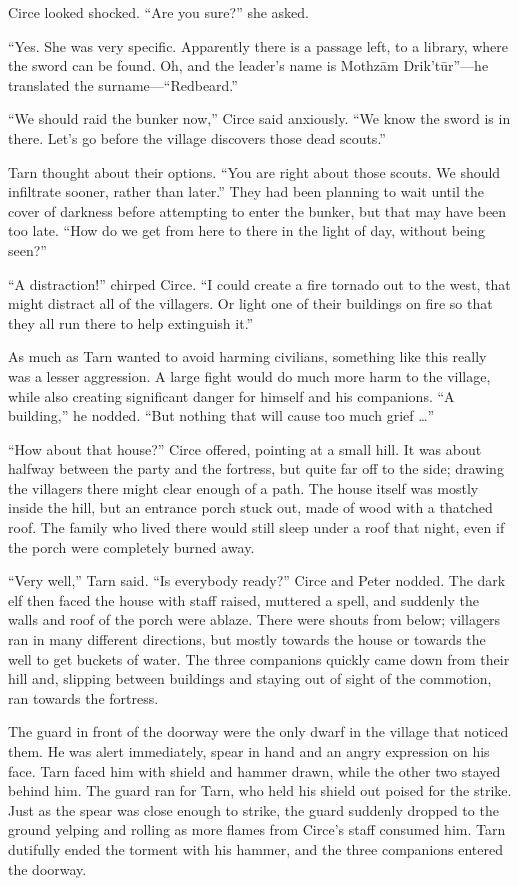 Circe looked shocked.  ``Are you sure?'' she asked.

``Yes.  She was very specific.  Apparently there is a passage left, to a library, where the sword can be found.  Oh, and the leader's name is Mothz\=am Drik't\=ur''---he translated the surname---``Redbeard.''

``We should raid the bunker now,'' Circe said anxiously.  ``We know the sword is in there.  Let's go before the village discovers those dead scouts.''

Tarn thought about their options.  ``You are right about those scouts.  We should infiltrate sooner, rather than later.''  They had been planning to wait until the cover of darkness before attempting to enter the bunker, but that may have been too late.  ``How do we get from here to there in the light of day, without being seen?''

``A distraction!'' chirped Circe.  ``I could create a fire tornado out to the west, that might distract all of the villagers.  Or light one of their buildings on fire so that they all run there to help extinguish it.''

As much as Tarn wanted to avoid harming civilians, something like this really was a lesser aggression.  A large fight would do much more harm to the village, while also creating significant danger for himself and his companions.  ``A building,'' he nodded.  ``But nothing that will cause too much grief \ldots''

``How about that house?'' Circe offered, pointing at a small hill.  It was about halfway between the party and the fortress, but quite far off to the side; drawing the villagers there might clear enough of a path.  The house itself was mostly inside the hill, but an entrance porch stuck out, made of wood with a thatched roof.  The family who lived there would still sleep under a roof that night, even if the porch were completely burned away.

``Very well,'' Tarn said. ``Is everybody ready?''  Circe and Peter nodded.  The dark elf then faced the house with staff raised, muttered a spell, and suddenly the walls and roof of the porch were ablaze.  There were shouts from below; villagers ran in many different directions, but mostly towards the house or towards the well to get buckets of water.  The three companions quickly came down from their hill and, slipping between buildings and staying out of sight of the commotion, ran towards the fortress.

The guard in front of the doorway were the only dwarf in the village that noticed them.  He was alert immediately, spear in hand and an angry expression on his face.  Tarn faced him with shield and hammer drawn, while the other two stayed behind him.  The guard ran for Tarn, who held his shield out poised for the strike.  Just as the spear was close enough to strike, the guard suddenly dropped to the ground yelping and rolling as more flames from Circe's staff consumed him.  Tarn dutifully ended the torment with his hammer, and the three companions entered the doorway.